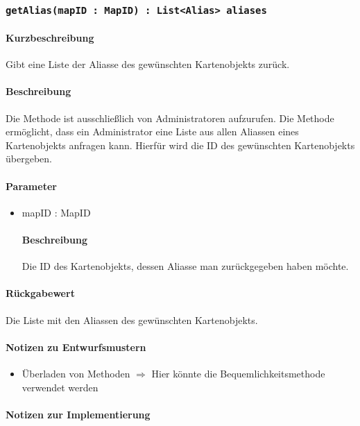 \subsubsection{\texttt{getAlias(mapID : MapID) : List<Alias> aliases}}%
\paragraph*{Kurzbeschreibung}
Gibt eine Liste der Aliasse des gewünschten Kartenobjekts zurück.
\paragraph*{Beschreibung}
Die Methode ist ausschließlich von Administratoren aufzurufen.
Die Methode ermöglicht, dass ein Administrator eine Liste aus allen Aliassen eines Kartenobjekts anfragen kann.
Hierfür wird die ID des gewünschten Kartenobjekts übergeben.
\paragraph*{Parameter}
\begin{itemize}
    \item mapID : MapID
    		\paragraph*{Beschreibung}
    		Die ID des Kartenobjekts, dessen Aliasse man zurückgegeben haben möchte.
\end{itemize}
\paragraph*{Rückgabewert}
Die Liste mit den Aliassen des gewünschten Kartenobjekts.

\paragraph*{Notizen zu Entwurfsmustern}
\begin{itemize}
	\item Überladen von Methoden $\Rightarrow$ Hier könnte die Bequemlichkeitsmethode verwendet werden
\end{itemize}

\paragraph*{Notizen zur Implementierung}%
